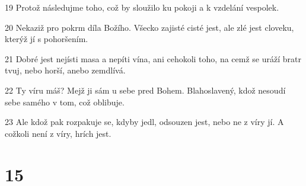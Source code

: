 \par 19 Protož následujme toho, což by sloužilo ku pokoji a k vzdelání vespolek.
\par 20 Nekaziž pro pokrm díla Božího. Všecko zajisté cisté jest, ale zlé jest cloveku, kterýž jí s pohoršením.
\par 21 Dobré jest nejísti masa a nepíti vína, ani cehokoli toho, na cemž se uráží bratr tvuj, nebo horší, anebo zemdlívá.
\par 22 Ty víru máš? Mejž ji sám u sebe pred Bohem. Blahoslavený, kdož nesoudí sebe samého v tom, což oblibuje.
\par 23 Ale kdož pak rozpakuje se, kdyby jedl, odsouzen jest, nebo ne z víry jí. A cožkoli není z víry, hrích jest.

\chapter{15}

